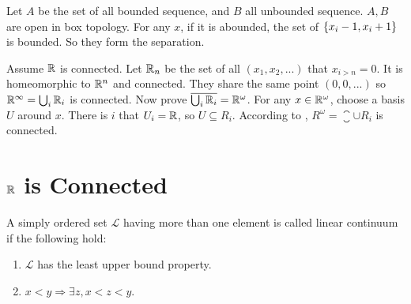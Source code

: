 \begin{example}
    Let $A$ be the set of all bounded sequence, and $B$ all unbounded sequence. $A,B$ are open in box topology. For any $x$, if it is abounded, the set of $\set{x_i -1, x_i + 1}$ is bounded. So they form the separation.
\end{example}

\begin{example}
    Assume $\mathbb{R}$ is connected. Let $\mathbb{R}_n$ be the set of all $(x_1, x_2, ...)$ that $x_{i > n} = 0$. It is homeomorphic to $\mathbb{R}^n$ and connected. They share the same point $(0,0,...)$ so $\mathbb{R}^\infty = \bigcup_i \mathbb{R}_i$ is connected. Now prove $\overline{\bigcup_i \mathbb{R}_i} = \mathbb{R}^\omega$. For any $x \in \mathbb{R}^\omega$, choose a basis $U$ around $x$. There is $i$ that $U_i = \mathbb{R}$, so $U \subseteq R_i$. According to , $R^\omega = \closure{\cup R_i}$ is connected.
\end{example}


\section{$\mathbb{R}$ is Connected}

\begin{definition}
    A simply ordered set $\mathcal{L}$ having more than one element is called linear continuum if the following hold:
    \begin{enumerate}
        \item $\mathcal{L}$ has the least upper bound property.
        \item $x < y \Rightarrow \exists z, x < z < y$.
    \end{enumerate}
\end{definition}

